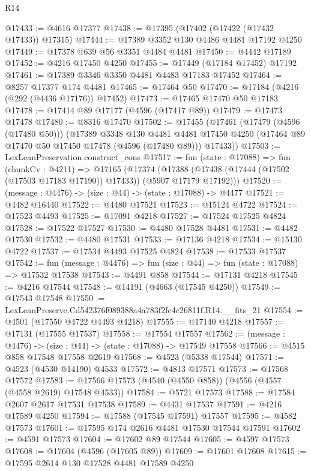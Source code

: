 \begin{lexlean}{R14}
\begin{coremodule}
@17433 := @4616 @17377
@17438 := @17395 (@17402 (@17422 (@17432 @17433)) @17315)
@17444 := @17389 @3352 @130 @4486 @4481 @17192 @4250
@17449 := @17378 @639 @56 @3351 @4484 @4481
@17450 := @4442 @17189
@17452 := @4216 @17450 @4250
@17455 := @17449 (@17184 @17452) @17192
@17461 := @17389 @3346 @3350 @4481 @4483 @17183 @17452
@17464 := @8257 @17377 @174 @4481
@17465 := @17464 @50
@17470 := @17184 (@4216 (@292 (@4436 @17176)) @17452)
@17473 := @17465 @17470 @50 @17183
@17478 := @17414 @89 @17177 (@4596 (@17417 @89))
@17479 := @17473 @17478
@17480 := @8316 @17470
@17502 := @17455
    (@17461
      (@17479 (@4596 (@17480 @50)))
      (@17389
        @3348
        @130
        @4481
        @4481
        @17450
        @4250
        (@17464 @89 @17470 @50 @17450 @17478 (@4596 (@17480 @89)))
        @17433))
@17503 := LexLeanPreservation.construct_cons
@17517 := fun (state : @17088) =>
  fun (chunkCv : @4211) =>
  @17165
    (@17374 (@17388 (@17438 (@17444 (@17502 (@17503 @17183 @17190)) @17433)) (@5907 @17179 @17192)))
@17520 := (message : @4476) -> (size : @44) -> (state : @17088) -> @4477
@17521 := @4482 @16440
@17522 := @4480 @17521
@17523 := @15124 @4722
@17524 := @17523 @4493
@17525 := @17091 @4218
@17527 := @17524 @17525 @4824
@17528 := @17522 @17527
@17530 := @4480 @17528 @4481
@17531 := @4482 @17530
@17532 := @4480 @17531
@17533 := @17136 @4218
@17534 := @15130 @4722
@17537 := @17534 @4493 @17525 @4824
@17538 := @17533 @17537
@17542 := fun (message : @4476) => fun (size : @44) => fun (state : @17088) => @17532 @17538
@17543 := @4491 @858
@17544 := @17131 @4218
@17545 := @4216 @17544
@17548 := @14191 (@4663 (@17545 @4250))
@17549 := @17543 @17548
@17550 := LexLeanPreserve.Cd542376f089388a4a783f2fc4c26811f.R14.__fits_21
@17554 := @4501 (@17550 @4722 @4493 @4218)
@17555 := @17140 @4218
@17557 := @17131 (@17555 @17537)
@17558 := @17554 @17557
@17562 := (message : @4476) -> (size : @44) -> (state : @17088) -> @17549 @17558
@17566 := @4515 @858 @17548 @17558 @2619
@17568 := @4523 (@5338 @17544)
@17571 := @4523 (@4530 @14190) @4533
@17572 := @4813 @17571
@17573 := @17568 @17572
@17583 := @17566 @17573 (@4540 (@4550 @858)) (@4556 (@4557 (@4558 @2619) @17548 @4533))
@17584 := @5721 @17573
@17588 := @17584 @2607 @2617 @17531 @17538
@17589 := @4431 @17537
@17591 := @4216 @17589 @4250
@17594 := @17588 (@17545 @17591) @17557
@17595 := @4582 @17573
@17601 := @17595 @174 @2616 @4481 @17530 @17544 @17591
@17602 := @4591 @17573
@17604 := @17602 @89 @17544
@17605 := @4597 @17573
@17608 := @17604 (@4596 (@17605 @89))
@17609 := @17601 @17608
@17615 := @17595 @2614 @130 @17528 @4481 @17589 @4250

\end{coremodule}
\end{lexlean}
